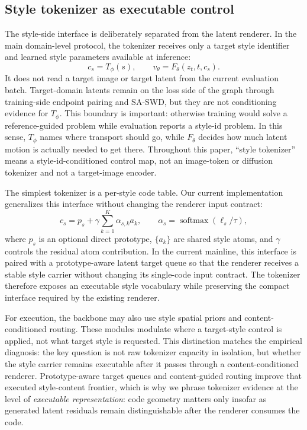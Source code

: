 \documentclass[letterpaper]{article}
\begin{document}
\subsection{Style tokenizer as executable control}
The style-side interface is deliberately separated from the latent renderer. In the main domain-level protocol, the tokenizer receives only a target style identifier and learned style parameters available at inference:
\begin{equation}
    c_s = T_\phi(s), \qquad v_\theta = F_\theta(z_t,t,c_s).
\end{equation}
It does not read a target image or target latent from the current evaluation batch. Target-domain latents remain on the loss side of the graph through training-side endpoint pairing and SA-SWD, but they are not conditioning evidence for $T_\phi$. This boundary is important: otherwise training would solve a reference-guided problem while evaluation reports a style-id problem. In this sense, $T_\phi$ names where transport should go, while $F_\theta$ decides how much latent motion is actually needed to get there.
Throughout this paper, ``style tokenizer'' means a style-id-conditioned control map, not an image-token or diffusion tokenizer and not a target-image encoder.

The simplest tokenizer is a per-style code table. Our current implementation generalizes this interface without changing the renderer input contract:
\begin{equation}
    c_s = p_s + \gamma \sum_{k=1}^{K}\alpha_{s,k} a_k,
    \qquad
    \alpha_s=\operatorname{softmax}(\ell_s/\tau),
\end{equation}
where $p_s$ is an optional direct prototype, $\{a_k\}$ are shared style atoms, and $\gamma$ controls the residual atom contribution. In the current mainline, this interface is paired with a prototype-aware latent target queue so that the renderer receives a stable style carrier without changing its single-code input contract. The tokenizer therefore exposes an executable style vocabulary while preserving the compact interface required by the existing renderer.

For execution, the backbone may also use style spatial priors and content-conditioned routing. These modules modulate where a target-style control is applied, not what target style is requested. This distinction matches the empirical diagnosis: the key question is not raw tokenizer capacity in isolation, but whether the style carrier remains executable after it passes through a content-conditioned renderer. Prototype-aware target queues and content-guided routing improve that executed style-content frontier, which is why we phrase tokenizer evidence at the level of \emph{executable representation}: code geometry matters only insofar as generated latent residuals remain distinguishable after the renderer consumes the code.
\end{document}

